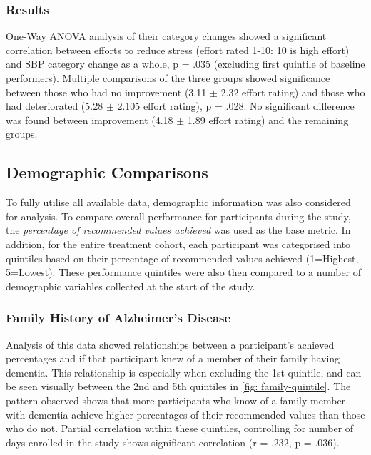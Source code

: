 \subsubsection{Results}
One-Way ANOVA analysis of their category changes showed a significant correlation between efforts to reduce stress (effort rated 1-10: 10 is high effort) and SBP category change as a whole, p = .035 (excluding first quintile of baseline performers). Multiple comparisons of the three groups showed significance between those who had no improvement (3.11 $\pm$ 2.32 effort rating) and those who had deteriorated (5.28 $\pm$ 2.105 effort rating), p = .028. No significant difference was found between improvement (4.18 $\pm$ 1.89 effort rating) and the remaining groups.

\subsection{Demographic Comparisons}
To fully utilise all available data, demographic information was also considered for analysis. To compare overall performance for participants during the study, the \textit{percentage of recommended values achieved} was used as the base metric. In addition, for the entire treatment cohort, each participant was categorised into quintiles based on their percentage of recommended values achieved (1=Highest, 5=Lowest). These performance quintiles were also then compared to a number of demographic variables collected at the start of the study.

\subsubsection{Family History of Alzheimer's Disease}
Analysis of this data showed relationships between a participant’s achieved percentages and if that participant knew of a member of their family having dementia. This relationship is especially when excluding the 1st quintile, and can be seen visually between the 2nd and 5th quintiles in \ref{fig: family-quintile}. The pattern observed shows that more participants who know of a family member with dementia achieve higher percentages of their recommended values than those who do not. Partial correlation within these quintiles, controlling for number of days enrolled in the study shows significant correlation (r = .232, p = .036).

